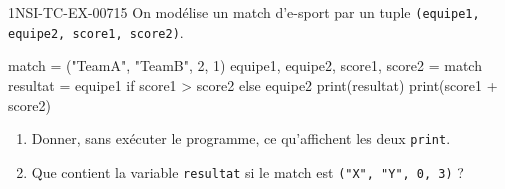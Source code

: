 \begin{exercice}{1NSI-TC-EX-007}{1}{5}
On modélise un match d'e-sport par un tuple \lstinline{(equipe1, equipe2, score1, score2)}.
\begin{python}
match = ("TeamA", "TeamB", 2, 1)
equipe1, equipe2, score1, score2 = match
resultat = equipe1 if score1 > score2 else equipe2
print(resultat)
print(score1 + score2)
\end{python}
\begin{enumerate}
  \item Donner, sans exécuter le programme, ce qu'affichent les deux \lstinline{print}.
  \item Que contient la variable \lstinline{resultat} si le match est \lstinline{("X", "Y", 0, 3)} ?
\end{enumerate}
\end{exercice}

